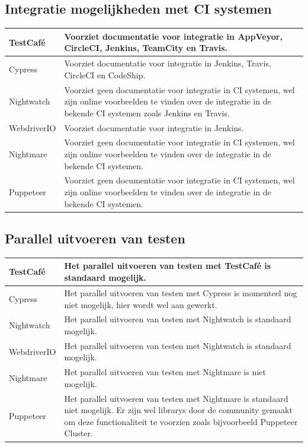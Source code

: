 \subsection{Integratie mogelijkheden met CI systemen}
\begin{tabular}{ | l | p{12cm} | }
\hline
 TestCafé & Voorziet documentatie voor integratie in AppVeyor, CircleCI, Jenkins, TeamCity en Travis.\\
\hline
 Cypress & Voorziet documentatie voor integratie in Jenkins, Travis, CircleCI en CodeShip.\\
\hline
 Nightwatch & Voorziet geen documentatie voor integratie in \gls{CI} systemen, wel zijn online voorbeelden te vinden over de integratie in de bekende \gls{CI} systemen zoals Jenkins en Travis. \\
\hline
 WebdriverIO & Voorziet documentatie voor integratie in Jenkins.\\
\hline
 Nightmare & Voorziet geen documentatie voor integratie in \gls{CI} systemen, wel zijn online voorbeelden te vinden over de integratie in de bekende \gls{CI} systemen.\\
\hline
 Puppeteer & Voorziet geen documentatie voor integratie in \gls{CI} systemen, wel zijn online voorbeelden te vinden over de integratie in de bekende \gls{CI} systemen.\\
\hline
\end{tabular}
\subsection{Parallel uitvoeren van testen}
\begin{tabular}{ | l | p{12cm} | }
\hline
 TestCafé & Het parallel uitvoeren van testen met TestCafé is standaard mogelijk.\\
\hline
 Cypress & Het parallel uitvoeren van testen met Cypress is momenteel nog niet mogelijk, hier wordt wel aan gewerkt.\\
\hline
 Nightwatch & Het parallel uitvoeren van testen met Nightwatch is standaard mogelijk. \\
\hline
 WebdriverIO & Het parallel uitvoeren van testen met Nightwatch is standaard mogelijk.\\
\hline
 Nightmare & Het parallel uitvoeren van testen met Nightmare is niet mogelijk.\\
\hline
 Puppeteer & Het parallel uitvoeren van testen met Nightmare is standaard niet mogelijk. Er zijn wel \glspl{library} door de community gemaakt om deze functionaliteit te voorzien zoals bijvoorbeeld Puppeteer Cluster.\\
\hline
\end{tabular}


